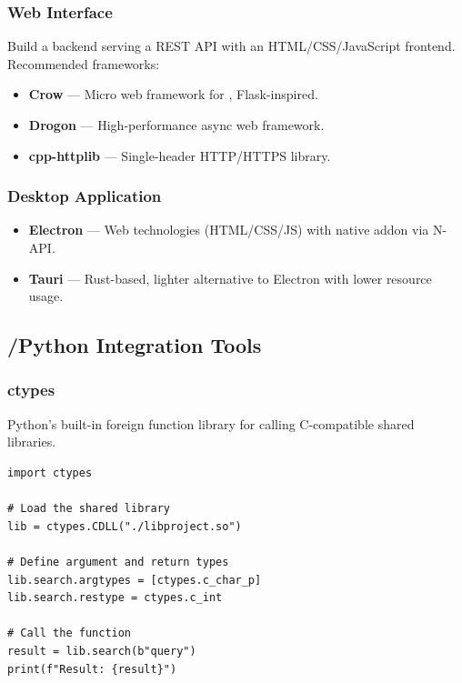 \subsubsection{Web Interface}

Build a \cpp{} backend serving a REST API with an HTML/CSS/JavaScript frontend. Recommended frameworks:

\begin{itemize}
  \item \textbf{Crow} --- Micro web framework for \cpp{}, Flask-inspired.
  \item \textbf{Drogon} --- High-performance async web framework.
  \item \textbf{cpp-httplib} --- Single-header HTTP/HTTPS library.
\end{itemize}

\subsubsection{Desktop Application}

\begin{itemize}
  \item \textbf{Electron} --- Web technologies (HTML/CSS/JS) with \cpp{} native addon via N-API.
  \item \textbf{Tauri} --- Rust-based, lighter alternative to Electron with lower resource usage.
\end{itemize}

\subsection{\cpp{}/Python Integration Tools}
\label{sec:integration-tools}

\subsubsection{ctypes}

Python's built-in foreign function library for calling C-compatible shared libraries.

\begin{lstlisting}[style=python]
import ctypes

# Load the shared library
lib = ctypes.CDLL("./libproject.so")

# Define argument and return types
lib.search.argtypes = [ctypes.c_char_p]
lib.search.restype = ctypes.c_int

# Call the function
result = lib.search(b"query")
print(f"Result: {result}")
\end{lstlisting}

